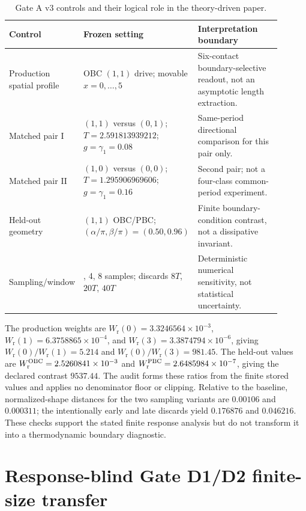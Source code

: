 \documentclass[11pt]{article}
\newcommand{\Wraw}{W_{\mathrm r}}
\begin{document}
\begin{table}[ht]
\centering
\begin{threeparttable}
\caption{Gate A v3 controls and their logical role in the theory-driven paper.}
\begin{tabular}{>{\raggedright\arraybackslash}p{0.26\linewidth}>{\raggedright\arraybackslash}p{0.31\linewidth}>{\raggedright\arraybackslash}p{0.33\linewidth}}
\toprule
Control & Frozen setting & Interpretation boundary \\
\midrule
Production spatial profile & OBC $(1,1)$ drive; movable $x=0,\ldots,5$ & Six-contact boundary-selective readout, not an asymptotic length extraction. \\
Matched pair I & $(1,1)$ versus $(0,1)$; $T=2.591813939212$; $g=\gamma_1=0.08$ & Same-period directional comparison for this pair only. \\
Matched pair II & $(1,0)$ versus $(0,0)$; $T=1.295906969606$; $g=\gamma_1=0.16$ & Second pair; not a four-class common-period experiment. \\
Held-out geometry & $(1,1)$ OBC/PBC; $(\alpha/\pi,\beta/\pi)=(0.50,0.96)$ & Finite boundary-condition contrast, not a dissipative invariant. \\
Sampling/window & 2, 4, 8 samples; discards $8T$, $20T$, $40T$ & Deterministic numerical sensitivity, not statistical uncertainty. \\
\bottomrule
\end{tabular}
\end{threeparttable}
\end{table}

The production weights are $\Wraw(0)=3.3246564\times10^{-3}$, $\Wraw(1)=6.3758865\times10^{-4}$, and $\Wraw(3)=3.3874794\times10^{-6}$, giving $\Wraw(0)/\Wraw(1)=5.214$ and $\Wraw(0)/\Wraw(3)=981.45$. The held-out values are $W_{\rm r}^{\rm OBC}=2.5260841\times10^{-3}$ and $W_{\rm r}^{\rm PBC}=2.6485984\times10^{-7}$, giving the declared contrast $9537.44$. The audit forms these ratios from the finite stored values and applies no denominator floor or clipping. Relative to the baseline, normalized-shape distances for the two sampling variants are $0.00106$ and $0.000311$; the intentionally early and late discards yield $0.176876$ and $0.046216$. These checks support the stated finite response analysis but do not transform it into a thermodynamic boundary diagnostic.

\clearpage
\section{Response-blind Gate D1/D2 finite-size transfer}
\label{sec:supp-gated}
\end{document}
